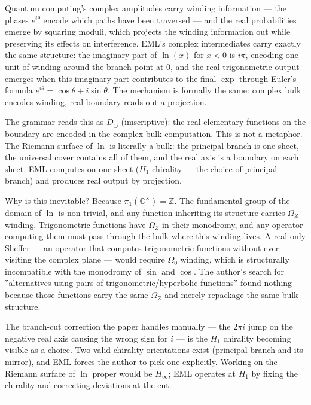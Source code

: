 \documentclass[12pt,a4paper]{article}
\begin{document}
Quantum computing's complex amplitudes carry winding information --- the phases
$e^{i\theta}$ encode which paths have been traversed --- and the real probabilities
emerge by squaring moduli, which projects the winding information out while
preserving its effects on interference. EML's complex intermediates carry exactly
the same structure: the imaginary part of $\ln(x)$ for $x < 0$ is $i\pi$,
encoding one unit of winding around the branch point at $0$, and the real
trigonometric output emerges when this imaginary part contributes to the final
$\exp$ through Euler's formula $e^{i\theta} = \cos\theta + i\sin\theta$. The
mechanism is formally the same: complex bulk encodes winding, real boundary reads
out a projection.

The grammar reads this as $D_{\odot}$ (imscriptive): the real elementary functions
on the boundary are encoded in the complex bulk computation. This is not a
metaphor. The Riemann surface of $\ln$ is literally a bulk: the principal branch
is one sheet, the universal cover contains all of them, and the real axis is a
boundary on each sheet. EML computes on one sheet ($H_1$ chirality --- the choice
of principal branch) and produces real output by projection.

Why is this inevitable? Because $\pi_1(\mathbb{C}^\times) = \mathbb{Z}$. The
fundamental group of the domain of $\ln$ is non-trivial, and any function
inheriting its structure carries $\Omega_Z$ winding. Trigonometric functions have
$\Omega_Z$ in their monodromy, and any operator computing them must pass through
the bulk where this winding lives. A real-only Sheffer --- an operator that computes
trigonometric functions without ever visiting the complex plane --- would require
$\Omega_0$ winding, which is structurally incompatible with the monodromy of
$\sin$ and $\cos$. The author's search for ''alternatives using pairs of
trigonometric/hyperbolic functions'' found nothing because those functions carry
the same $\Omega_Z$ and merely repackage the same bulk structure.

The branch-cut correction the paper handles manually --- the $2\pi i$ jump on the
negative real axis causing the wrong sign for $i$ --- is the $H_1$ chirality
becoming visible as a choice. Two valid chirality orientations exist (principal
branch and its mirror), and EML forces the author to pick one explicitly. Working
on the Riemann surface of $\ln$ proper would be $H_{\infty}$; EML operates at $H_1$
by fixing the chirality and correcting deviations at the cut.

\begin{center}
\rule{0.5\textwidth}{0.4pt}
\end{center}
\end{document}
